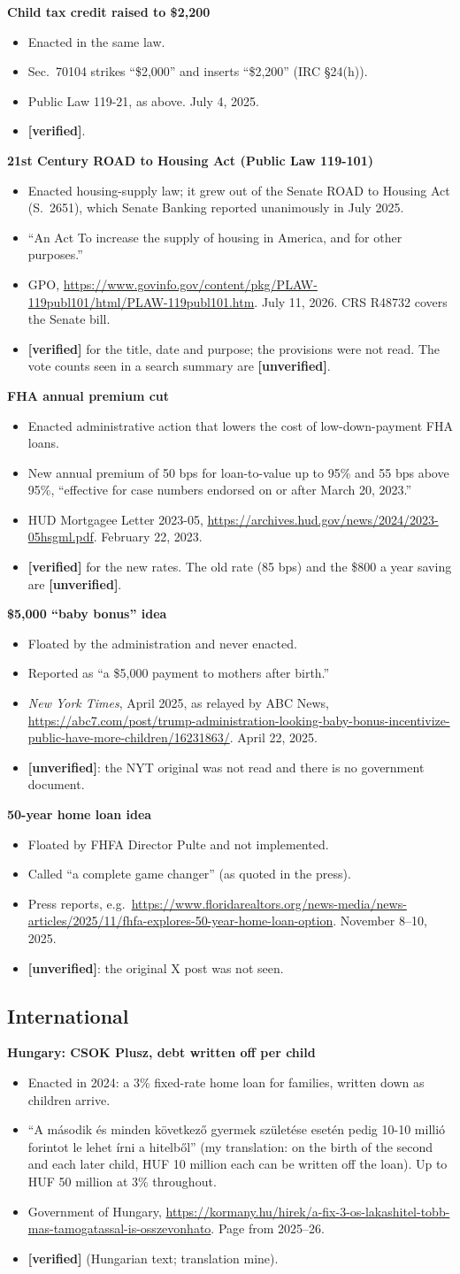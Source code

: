 \documentclass[10pt]{article}
\newcommand{\ok}{\textcolor{green!45!black}{\textbf{[verified]}}}
\newcommand{\unv}{\textcolor{red!70!black}{\textbf{[unverified]}}}
\newcommand{\entry}[5]{%
  \textbf{#1}\par
  \begin{itemize}
    \item #2
    \item #3
    \item #4
    \item #5
  \end{itemize}}
\begin{document}
\entry{Child tax credit raised to \$2,200}
{Enacted in the same law.}
{Sec.~70104 strikes ``\$2,000'' and inserts ``\$2,200'' (IRC \S24(h)).}
{Public Law 119-21, as above. July 4, 2025.}
{\ok.}

\entry{21st Century ROAD to Housing Act (Public Law 119-101)}
{Enacted housing-supply law; it grew out of the Senate ROAD to Housing Act (S.~2651), which Senate Banking reported unanimously in July 2025.}
{``An Act To increase the supply of housing in America, and for other purposes.''}
{GPO, \url{https://www.govinfo.gov/content/pkg/PLAW-119publ101/html/PLAW-119publ101.htm}. July 11, 2026. CRS R48732 covers the Senate bill.}
{\ok{} for the title, date and purpose; the provisions were not read. The vote counts seen in a search summary are \unv.}

\entry{FHA annual premium cut}
{Enacted administrative action that lowers the cost of low-down-payment FHA loans.}
{New annual premium of 50 bps for loan-to-value up to 95\% and 55 bps above 95\%, ``effective for case numbers endorsed on or after March 20, 2023.''}
{HUD Mortgagee Letter 2023-05, \url{https://archives.hud.gov/news/2024/2023-05hsgml.pdf}. February 22, 2023.}
{\ok{} for the new rates. The old rate (85 bps) and the \$800 a year saving are \unv.}

\entry{\$5,000 ``baby bonus'' idea}
{Floated by the administration and never enacted.}
{Reported as ``a \$5,000 payment to mothers after birth.''}
{\emph{New York Times}, April 2025, as relayed by ABC News, \url{https://abc7.com/post/trump-administration-looking-baby-bonus-incentivize-public-have-more-children/16231863/}. April 22, 2025.}
{\unv: the NYT original was not read and there is no government document.}

\entry{50-year home loan idea}
{Floated by FHFA Director Pulte and not implemented.}
{Called ``a complete game changer'' (as quoted in the press).}
{Press reports, e.g.\ \url{https://www.floridarealtors.org/news-media/news-articles/2025/11/fhfa-explores-50-year-home-loan-option}. November 8--10, 2025.}
{\unv: the original X post was not seen.}

\subsection*{International}

\entry{Hungary: CSOK Plusz, debt written off per child}
{Enacted in 2024: a 3\% fixed-rate home loan for families, written down as children arrive.}
{``A második és minden következő gyermek születése esetén pedig 10-10 millió forintot le lehet írni a hitelből'' (my translation: on the birth of the second and each later child, HUF 10 million each can be written off the loan). Up to HUF 50 million at 3\% throughout.}
{Government of Hungary, \url{https://kormany.hu/hirek/a-fix-3-os-lakashitel-tobb-mas-tamogatassal-is-osszevonhato}. Page from 2025--26.}
{\ok{} (Hungarian text; translation mine).}
\end{document}
